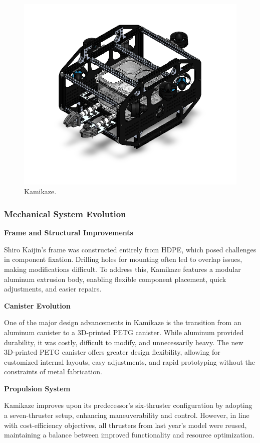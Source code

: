 \begin{figure}[h]
    \centering
    \includegraphics[width=0.8\columnwidth]{Sections/2Design Rationale/images/Kamikaze.png}
    \caption{Kamikaze.}
    \label{fig:Kamikaze}
\end{figure}

\subsubsection{Mechanical System Evolution}
\vspace{0pt}
\textbf{Frame and Structural Improvements}

Shiro Kaijin’s frame was constructed entirely from HDPE, which posed challenges in component fixation. Drilling holes for mounting often led to overlap issues, making modifications difficult. To address this, Kamikaze features a modular aluminum extrusion body, enabling flexible component placement, quick adjustments, and easier repairs.

\vspace{0.2cm}
\textbf{Canister Evolution}

One of the major design advancements in Kamikaze is the transition from an aluminum canister to a 3D-printed PETG canister. While aluminum provided durability, it was costly, difficult to modify, and unnecessarily heavy. The new 3D-printed PETG canister offers greater design flexibility, allowing for customized internal layouts, easy adjustments, and rapid prototyping without the constraints of metal fabrication.

\vspace{0.2cm}
\textbf{Propulsion System}

Kamikaze improves upon its predecessor’s six-thruster configuration by adopting a seven-thruster setup, enhancing maneuverability and control. However, in line with cost-efficiency objectives, all thrusters from last year’s model were reused, maintaining a balance between improved functionality and resource optimization.

